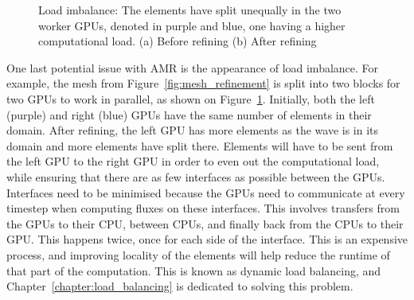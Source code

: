 \begin{figure}[H]
	\centering
	\hfill
	\caption{Load imbalance: The elements have split unequally in the two worker GPUs, denoted in purple and blue, one having a higher computational load. (a) Before refining (b) After refining}
	\label{fig:load_imbalance}
\end{figure}

One last potential issue with AMR is the appearance of load imbalance. For example, the mesh from
Figure~\ref{fig:mesh_refinement} is split into two blocks for two GPUs to work in parallel, as shown
on Figure~\ref{fig:load_imbalance}. Initially, both the left (purple) and right (blue) GPUs have the
same number of elements in their domain. After refining, the left GPU has more elements as the wave
is in its domain and more elements have split there. Elements will have to be sent from the left GPU
to the right GPU in order to even out the computational load, while ensuring that there are as few
interfaces as possible between the GPUs. Interfaces need to be minimised because the GPUs need to
communicate at every timestep when computing fluxes on these interfaces. This involves transfers
from the GPUs to their CPU, between CPUs, and finally back from the CPUs to their GPU. This happens
twice, once for each side of the interface. This is an expensive process, and improving locality of
the elements will help reduce the runtime of that part of the computation. This is known as dynamic
load balancing, and Chapter~\ref{chapter:load_balancing} is dedicated to solving this problem.

